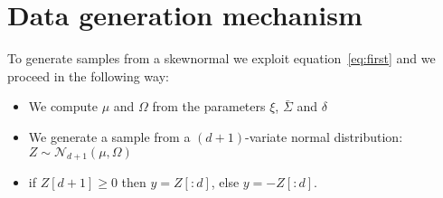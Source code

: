 \documentclass[fleqn]{article}
\theoremstyle{theorem}
\theoremstyle{definition}
\begin{document}
    \section{Data generation mechanism}
    To generate samples from a skewnormal we exploit equation~\eqref{eq:first} and we proceed in the following way:
    \begin{itemize}
        \item We compute $\mu$ and $\Omega$ from the parameters $\xi$, $\bar\Sigma$ and $\delta$
        \item We generate a sample from a $(d+1)$-variate normal distribution: $Z \sim \mathcal{N}_{d+1}(\mu,\Omega)$
        \item if $Z[d+1] \geq 0$ then $y = Z[:d]$, else $y = - Z[:d]$.
    \end{itemize}



    \printbibliography
\end{document}
